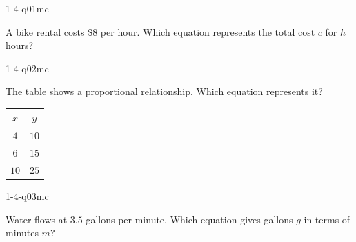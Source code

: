 

\begin{practiceQuestion}{1-4-q01}{mc}
\begin{questionText}
A bike rental costs $\$8$ per hour. Which equation represents the total cost $c$ for $h$ hours?
\end{questionText}
\end{practiceQuestion}

\begin{practiceQuestion}{1-4-q02}{mc}
\begin{questionText}
The table shows a proportional relationship. Which equation represents it?

\begin{center}
\begin{tabular}{|c|c|}
\hline $x$ & $y$ \\ \hline $4$ & $10$ \\ $6$ & $15$ \\ $10$ & $25$ \\ \hline
\end{tabular}
\end{center}
\end{questionText}
\end{practiceQuestion}

\begin{practiceQuestion}{1-4-q03}{mc}
\begin{questionText}
Water flows at $3.5$ gallons per minute. Which equation gives gallons $g$ in terms of minutes $m$?
\end{questionText}
\end{practiceQuestion}

